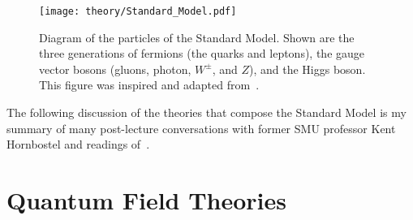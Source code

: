 \begin{figure}
 \centering
 \texttt{[image: theory/Standard\_Model.pdf]}
 \caption[Diagram of the particles of the Standard Model.]{%
  Diagram of the particles of the Standard Model.
  Shown are the three generations of fermions (the quarks and leptons), the gauge vector bosons (gluons, photon, $W^{\pm}$, and $Z$), and the Higgs boson.
  This figure was inspired and adapted from~\cite{web:Carsten_Burgard}.}
 \label{fig:Standard_Model}
\end{figure}

The following discussion of the theories that compose the Standard Model is my summary of many post-lecture conversations with former SMU professor Kent Hornbostel and readings of~\cite{Pich:2005mk}.

\clearpage
\section{Quantum Field Theories}\label{section:QFT}

